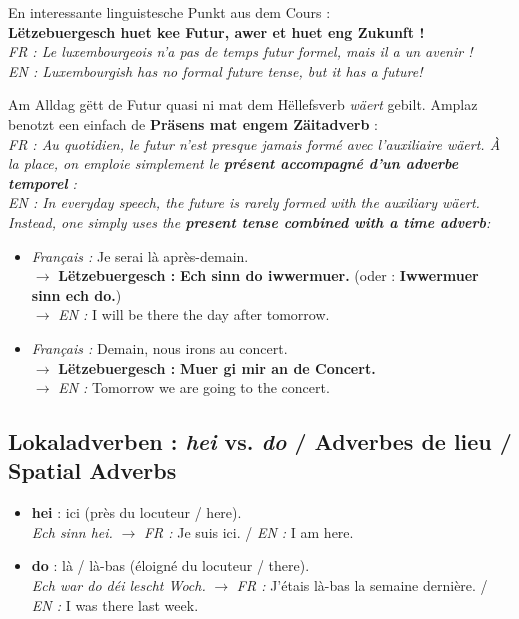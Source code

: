 En interessante linguistesche Punkt aus dem Cours : \\
\textbf{\flqq Lëtzebuergesch huet kee Futur, awer et huet eng Zukunft !\frqq} \\
\textit{FR : Le luxembourgeois n'a pas de temps futur formel, mais il a un avenir !} \\
\textit{EN : Luxembourgish has no formal future tense, but it has a future!}

Am Alldag gëtt de Futur quasi ni mat dem Hëllefsverb \textit{wäert} gebilt. Amplaz benotzt een einfach de \textbf{Präsens mat engem Zäitadverb} : \\
\textit{FR : Au quotidien, le futur n'est presque jamais formé avec l'auxiliaire \textit{wäert}. À la place, on emploie simplement le \textbf{présent accompagné d'un adverbe temporel} :} \\
\textit{EN : In everyday speech, the future is rarely formed with the auxiliary \textit{wäert}. Instead, one simply uses the \textbf{present tense combined with a time adverb}:}

\begin{itemize}
    \item \textit{Français :} \flqq Je serai là après-demain.\frqq \\
    $\rightarrow$ \textbf{Lëtzebuergesch :} \textbf{Ech sinn do iwwermuer.} (oder : \textbf{Iwwermuer sinn ech do.}) \\
    $\rightarrow$ \textit{EN :} I will be there the day after tomorrow.
    \item \textit{Français :} \flqq Demain, nous irons au concert.\frqq \\
    $\rightarrow$ \textbf{Lëtzebuergesch :} \textbf{Muer gi mir an de Concert.} \\
    $\rightarrow$ \textit{EN :} Tomorrow we are going to the concert.
\end{itemize}

\subsection{Lokaladverben : \textit{hei} vs. \textit{do} / Adverbes de lieu / Spatial Adverbs}
\begin{itemize}
    \item \textbf{hei} : ici (près du locuteur / here). \\
    \textit{Ech sinn hei.} $\rightarrow$ \textit{FR :} Je suis ici. / \textit{EN :} I am here.
    \item \textbf{do} : là / là-bas (éloigné du locuteur / there). \\
    \textit{Ech war do déi lescht Woch.} $\rightarrow$ \textit{FR :} J'étais là-bas la semaine dernière. / \textit{EN :} I was there last week.
\end{itemize}


